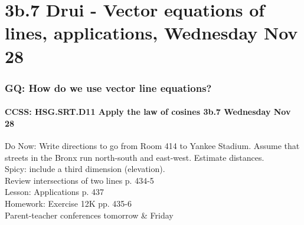 \documentclass{beamer}
\begin{document}
  \section{3b.7 Drui - Vector equations of lines, applications, Wednesday Nov 28}
    \frame
    {
      \frametitle{GQ: How do we use vector line equations?}
      \framesubtitle{CCSS: HSG.SRT.D11 Apply the law of cosines \qquad \alert{3b.7 Wednesday Nov 28}}

        Do Now: Write directions to go from Room 414 to Yankee Stadium. Assume that streets in the Bronx run north-south and east-west. Estimate distances. \\[0.5cm]
        Spicy: include a third dimension (elevation).\\[1cm]

      Review intersections of two lines p. 434-5\\
      Lesson: Applications p. 437 \\
      Homework: Exercise 12K pp. 435-6\\[0.5cm]
      \alert{Parent-teacher conferences tomorrow \& Friday}
    }
\end{document}
